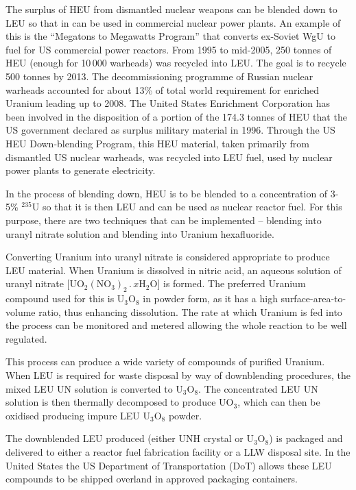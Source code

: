 \documentclass[twoside,titlepage,11pt,twocolumn,a4paper]{article}
\begin{document}
The surplus of HEU from dismantled nuclear weapons can be blended down
to LEU so that in can be used in commercial nuclear power plants. An
example of this is the ``Megatons to Megawatts Program'' that converts
ex-Soviet WgU to fuel for US commercial power reactors. From 1995 to
mid-2005, 250 tonnes of HEU (enough for 10\,000 warheads) was recycled
into LEU. The goal is to recycle 500 tonnes by 2013. The
decommissioning programme of Russian nuclear warheads accounted for
about 13\% of total world requirement for enriched Uranium leading up
to 2008. \citep{UraniumEnrichment} The United States Enrichment
Corporation has been involved in the disposition of a portion of the
174.3 tonnes of HEU that the US government declared as surplus
military material in 1996. Through the US HEU Down-blending Program,
this HEU material, taken primarily from dismantled US nuclear
warheads, was recycled into LEU fuel, used by nuclear power plants to
generate electricity.

In the process of blending down, HEU is to be blended to a
concentration of 3-5\% \( \mathrm{^{235}U} \) so that it is then LEU
and can be used as nuclear reactor fuel. For this purpose, there are
two techniques that can be implemented -- blending into uranyl nitrate
solution and blending into Uranium hexafluoride.

Converting Uranium into uranyl nitrate is considered appropriate to
produce LEU material.  When Uranium is dissolved in nitric acid, an
aqueous solution of uranyl nitrate
[\(\mathrm{UO_2(NO_3)_2\,.\,}x\mathrm{H_2O}\)] is formed. The
preferred Uranium compound used for this is \(\mathrm{U_3O_8}\) in
powder form, as it has a high surface-area-to-volume ratio, thus
enhancing dissolution. The rate at which Uranium is fed into the
process can be monitored and metered allowing the whole reaction to be
well regulated.

This process can produce a wide variety of compounds of purified
Uranium. When LEU is required for waste disposal by way of
downblending procedures, the mixed LEU UN solution is converted to
\(\mathrm{U_3O_8}\). The concentrated LEU UN solution is then
thermally decomposed to produce \(\mathrm{UO_3}\), which can then be
oxidised producing impure LEU \(\mathrm{U_3O_8}\) powder.

The downblended LEU produced (either UNH crystal or
\(\mathrm{U_3O_8}\)) is packaged and delivered to either a reactor
fuel fabrication facility or a LLW disposal site. In the United States
the US Department of Transportation (DoT) allows these LEU compounds
to be shipped overland in approved packaging containers.
\end{document}
